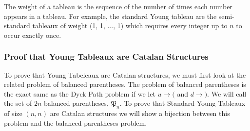 \documentclass[12pt]{article}
\newcommand{\BalParen}{\mathfrak{P}}
\begin{document}
The weight of a tableau is the sequence of the number of times each number appears in a tableau. For example, the standard Young tableau are the semi-standard tableaux of weight (1, 1, ..., 1) which requires every integer up to $n$ to occur exactly once.

\subsubsection{Proof that Young Tableaux are Catalan Structures}
To prove that Young Tabeleaux are Catalan structures, we must first look at the related problem of balanced parentheses. The problem of balanced parentheses is the exact same as the Dyck Path problem if we let $u \rightarrow ($ and $d \rightarrow )$. We will call the set of $2n$ balanced parentheses, $\BalParen_n$. To prove that Standard Young Tableaux of size $(n,n)$ are Catalan structures we will show a bijection between this problem and the balanced parentheses problem. \cite{YoungTableauxShirek}
\end{document}
